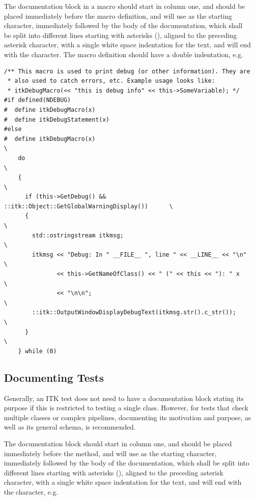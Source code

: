 The documentation block in a macro should start in column one, and should be
placed immediately before the macro definition, and will use \code{/*} as the
starting character, immediately followed by the body of the documentation, which
shall be split into different lines starting with asterisks (\code{*}), aligned
to the preceding asterisk character, with a single white space indentation for
the text, and will end with the \code{*/} character. The macro definition
should have a double indentation, e.g.

\small
\begin{verbatim}
/** This macro is used to print debug (or other information). They are
 * also used to catch errors, etc. Example usage looks like:
 * itkDebugMacro(<< "this is debug info" << this->SomeVariable); */
#if defined(NDEBUG)
#  define itkDebugMacro(x)
#  define itkDebugStatement(x)
#else
#  define itkDebugMacro(x)                                                   \
    do                                                                       \
    {                                                                        \
      if (this->GetDebug() && ::itk::Object::GetGlobalWarningDisplay())      \
      {                                                                      \
        std::ostringstream itkmsg;                                           \
        itkmsg << "Debug: In " __FILE__ ", line " << __LINE__ << "\n"         \
               << this->GetNameOfClass() << " (" << this << "): " x          \
               << "\n\n";                                                    \
        ::itk::OutputWindowDisplayDebugText(itkmsg.str().c_str());           \
      }                                                                      \
    } while (0)
\end{verbatim}
\normalsize


\subsection{Documenting Tests}%
\label{subsec:DocumentingTests}

Generally, an ITK test does not need to have a documentation block stating its
purpose if this is restricted to testing a single class. However, for tests that
check multiple classes or complex pipelines, documenting its motivation and
purpose, as well as its general schema, is recommended.

The documentation block should start in column one, and should be placed
immediately before the  method, and will use \code{/*} as the
starting character, immediately followed by the body of the documentation, which
shall be split into different lines starting with asterisks (\code{*}), aligned
to the preceding asterisk character, with a single white space indentation for
the text, and will end with the \code{*/} character, e.g.

